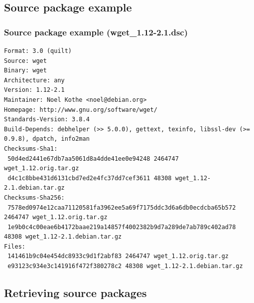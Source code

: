 \documentclass[10pt,final,handout]{beamer}
\newcommand{\br}{\vskip 1em}
\begin{document}
\subsection{Source package example}
\begin{frame}[fragile]
	\frametitle{Source package example (wget\_1.12-2.1.dsc)}
\begin{lstlisting}[basicstyle=\ttfamily\footnotesize]
Format: 3.0 (quilt)
Source: wget
Binary: wget
Architecture: any
Version: 1.12-2.1
Maintainer: Noel Kothe <noel@debian.org>
Homepage: http://www.gnu.org/software/wget/
Standards-Version: 3.8.4
Build-Depends: debhelper (>> 5.0.0), gettext, texinfo, libssl-dev (>= 0.9.8), dpatch, info2man
Checksums-Sha1: 
 50d4ed2441e67db7aa5061d8a4dde41ee0e94248 2464747 wget_1.12.orig.tar.gz
 d4c1c8bbe431d6131cbd7ed2e4fc37dd7cef3611 48308 wget_1.12-2.1.debian.tar.gz
Checksums-Sha256: 
 7578ed0974e12caa71120581fa3962ee5a69f7175ddc3d6a6db0ecdcba65b572 2464747 wget_1.12.orig.tar.gz
 1e9b0c4c00eae6b4172baae219a14857f4002382b9d7a289de7ab789c402ad78 48308 wget_1.12-2.1.debian.tar.gz
Files: 
 141461b9c04e454dc8933c9d1f2abf83 2464747 wget_1.12.orig.tar.gz
 e93123c934e3c141916f472f380278c2 48308 wget_1.12-2.1.debian.tar.gz
\end{lstlisting}
\end{frame}

\subsection{Retrieving source packages}
\end{document}
